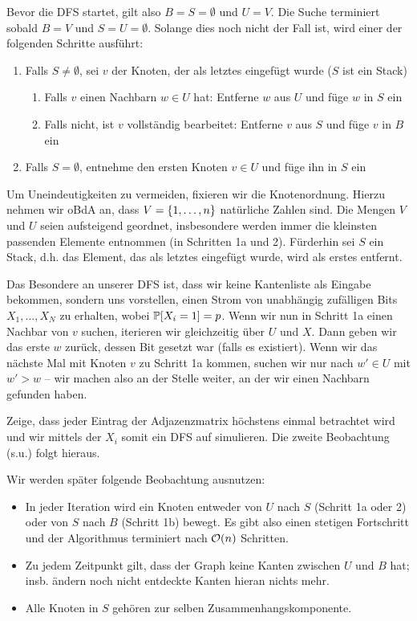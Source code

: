 Bevor die DFS startet, gilt also $B = S = \emptyset$ und $U = V$.
Die Suche terminiert sobald $B = V$ und $S = U = \emptyset$.
Solange dies noch nicht der Fall ist, wird einer der folgenden Schritte ausführt:

\begin{enumerate}
    \item Falls $S \ne \emptyset$, sei $v$ der Knoten, der als letztes eingefügt wurde ($S$ ist ein Stack)
          \begin{enumerate}
              \item Falls $v$ einen Nachbarn $w \in U$ hat: Entferne $w$ aus $U$ und füge $w$ in $S$ ein
              \item Falls nicht, ist $v$ vollständig bearbeitet: Entferne $v$ aus $S$ und füge $v$ in $B$ ein
          \end{enumerate}
    \item Falls $S = \emptyset$, entnehme den ersten Knoten $v \in U$ und füge ihn in $S$ ein
\end{enumerate}

Um Uneindeutigkeiten zu vermeiden, fixieren wir die Knotenordnung.
Hierzu nehmen wir oBdA an, dass $V = \left\{1, \ldots, n\right\}$ natürliche Zahlen sind.
Die Mengen $V$ und $U$ seien aufsteigend geordnet, insbesondere werden immer die kleinsten passenden Elemente entnommen (in Schritten 1a und 2).
Fürderhin sei $S$ ein Stack, d.h. das Element, das als letztes eingefügt wurde, wird als erstes entfernt.

Das Besondere an unserer DFS ist, dass wir keine Kantenliste als Eingabe bekommen, sondern uns vorstellen, einen Strom von unabhängig zufälligen Bits $X_1, \ldots, X_N$ zu erhalten, wobei $\mathbb{P}\!\left[X_i = 1\right] = p$.
Wenn wir nun in Schritt 1a einen Nachbar von $v$ suchen, iterieren wir gleichzeitig über $U$ und $X$.
Dann geben wir das erste $w$ zurück, dessen Bit gesetzt war (falls es existiert).
Wenn wir das nächste Mal mit Knoten $v$ zu Schritt 1a kommen, suchen wir nur nach $w' \in U$ mit $w' > w$ -- wir machen also an der Stelle weiter, an der wir einen Nachbarn gefunden haben.

\begin{exercise}
    Zeige, dass jeder Eintrag der Adjazenzmatrix höchstens einmal betrachtet wird und wir mittels der $X_i$ somit ein DFS auf \Gnp simulieren.
    Die zweite Beobachtung (s.u.) folgt hieraus.
\end{exercise}

\noindent
Wir werden später folgende Beobachtung ausnutzen:
\begin{itemize}
    \item In jeder Iteration wird ein Knoten entweder von $U$ nach $S$ (Schritt 1a oder 2) oder von $S$ nach $B$ (Schritt 1b) bewegt.
          Es gibt also einen stetigen Fortschritt und der Algorithmus terminiert nach $\mathcal{O}\!\left(n\right)$ Schritten.
    \item Zu jedem Zeitpunkt gilt, dass der Graph keine Kanten zwischen $U$ und $B$ hat; insb. ändern noch nicht entdeckte Kanten hieran nichts mehr.
    \item Alle Knoten in $S$ gehören zur selben Zusammenhangskomponente.
\end{itemize}

